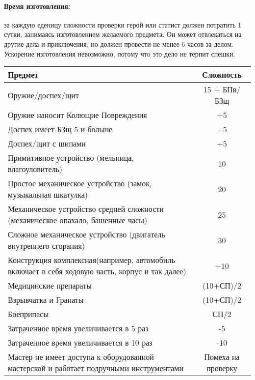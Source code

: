 \paragraph{Время изготовления:} за каждую еденицу сложности проверки герой или статист должен потратить 1 сутки, занимаясь изготовлением желаемого предмета. Он может отвлекаться на другие дела и приключения, но должен провести не менее 6 часов за делом. Ускорение изготовления невозможно, потому что это дело не терпит спешки.
\begin{center}
\begin{tabular}{|p{10cm}|c|}
\hline
Предмет & Сложность \\ \hline
Оружие/доспех/щит & 15 + БПв/БЗщ \\ \hline
Оружие наносит Колющие Повреждения & +5 \\ \hline
Доспех имеет БЗщ 5 и больше & +5 \\ \hline
Доспех/щит с шипами & +5 \\ \hline
Примитивное устройство (мельница, влагоуловитель) & 10 \\ \hline
Простое механическое устройство (замок, музыкальная шкатулка) & 20 \\ \hline
Механическое устройство средней сложности (механическое опахало, башенные часы) & 25 \\ \hline
Сложное механическое устройство (двигатель внутреннего сгорания) & 30 \\ \hline
Конструкция комплексная(например, автомобиль включает в себя ходовую часть, корпус и так далее) & +10 \\ \hline
Медицинские препараты & (10+СП)/2 \\ \hline
Взрывчатка и Гранаты & (10+СП)/2 \\ \hline
Боеприпасы & СП/2 \\ \hline
Затраченное время увеличивается в 5 раз & -5 \\ \hline
Затраченное время увеличивается в 10 раз & -10 \\ \hline
Мастер не имеет доступа к оборудованной мастерской и работает подручными инструментами & Помеха на проверку \\ \hline
\end{tabular}
\end{center}

